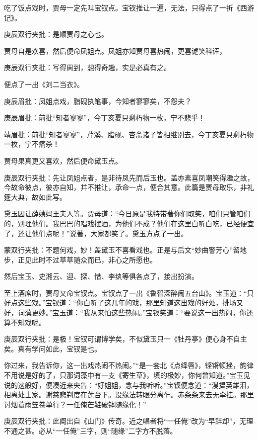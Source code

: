 \begin{parag}


    吃了饭点戏时，贾母一定先叫宝钗点。宝钗推让一遍，无法，只得点了一折《西游记》。\begin{note}庚辰双行夹批：是顺贾母之心也。\end{note}贾母自是欢喜，然后便命凤姐点。凤姐亦知贾母喜热闹，更喜谑笑科诨，\begin{note}庚辰双行夹批：写得周到，想得奇趣，实是必真有之。\end{note}便点了一出《刘二当衣》。\begin{note}庚辰眉批：凤姐点戏，脂砚执笔事，今知者寥寥矣，不怨夫？\end{note}\begin{note}庚辰眉批：前批“知者寥寥”，今丁亥夏只剩朽物一枚，宁不悲乎！\end{note}\begin{note}靖眉批：前批“知者寥寥”，芹溪、脂砚、杏斋诸子皆相继别去，今丁亥夏只剩朽物一枚，宁不痛杀！\end{note}贾母果真更又喜欢，然后便命黛玉点。\begin{note}庚辰双行夹批：先让凤姐点者，是非待凤先而后玉也。盖亦素喜凤嘲笑得趣之故，今故命彼点，彼亦自知，并不推让，承命一点，便合其意。此篇是贾母取乐，非礼筵大典，故如此写。\end{note}黛玉因让薛姨妈王夫人等。贾母道：“今日原是我特带著你们取笑，咱们只管咱们的，别理他们。我巴巴的唱戏摆酒，为他们不成？他们在这里白听白吃，已经便宜了，还让他们点呢！”说著，大家都笑了。黛玉方点了一出。\begin{note}蒙双行夹批：不题何戏，妙！盖黛玉不喜看戏也。正是与后文“妙曲警芳心”留地步，正见此时不过草草随众而已，非心之所愿也。\end{note}然后宝玉、史湘云、迎、探、惜、李纨等俱各点了，接出扮演。
\end{parag}


\begin{parag}


    至上酒席时，贾母又命宝钗点。宝钗点了一出《鲁智深醉闹五台山》。宝玉道：“只好点这些戏。”宝钗道：“你白听了这几年的戏，那里知道这出戏的好处，排场又好，词藻更妙。”宝玉道：“我从来怕这些热闹。”宝钗笑道：“要说这一出热闹，你还算不知戏呢。\begin{note}庚辰双行夹批：是极！宝钗可谓博学矣，不似黛玉只一《牡丹亭》便心身不自主矣。真有学问如此，宝钗是也。\end{note}你过来，我告诉你，这一出戏热闹不热闹。”“是一套北《点绛唇》，铿锵顿挫，韵律不用说是好的了，只那词藻中有一支《寄生草》，填的极妙，你何曾知道。”宝玉见说的这般好，便凑近来央告：“好姐姐，念与我听听。”宝钗便念道：“漫揾英雄泪，相离处士家。谢慈悲剃度在莲台下。没缘法转眼分离乍。赤条条来去无牵挂。那里讨烟蓑雨笠卷单行？一任俺芒鞋破钵随缘化！”\begin{note}庚辰双行夹批：此阕出自《山门》传奇。近之唱者将“一任俺”改为“早辞却”，无理不通之甚。必从“一任俺”三字，则“随缘”二字方不脱落。\end{note}
\end{parag}



